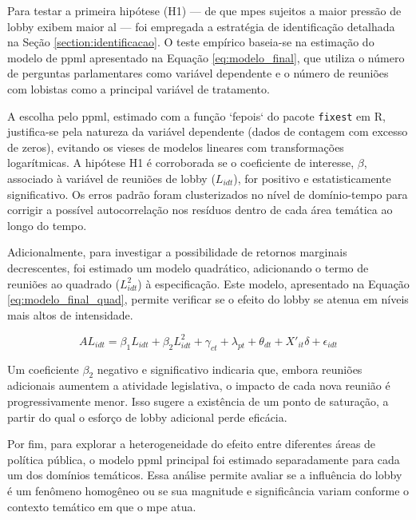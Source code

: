 Para testar a primeira hipótese (H1) — de que \acrshort{mpe}s sujeitos a maior pressão de lobby exibem maior \acrfull{al} — foi empregada a estratégia de identificação detalhada na Seção \ref{section:identificacao}. O teste empírico baseia-se na estimação do modelo de \acrfull{ppml} apresentado na Equação \ref{eq:modelo_final}, que utiliza o número de perguntas parlamentares como variável dependente e o número de reuniões com lobistas como a principal variável de tratamento.

A escolha pelo \acrshort{ppml}, estimado com a função `fepois` do pacote \texttt{fixest} em R, justifica-se pela natureza da variável dependente (dados de contagem com excesso de zeros), evitando os vieses de modelos lineares com transformações logarítmicas. A hipótese H1 é corroborada se o coeficiente de interesse, $\beta$, associado à variável de reuniões de lobby ($L_{idt}$), for positivo e estatisticamente significativo. Os erros padrão foram clusterizados no nível de domínio-tempo para corrigir a possível autocorrelação nos resíduos dentro de cada área temática ao longo do tempo.

Adicionalmente, para investigar a possibilidade de retornos marginais decrescentes, foi estimado um modelo quadrático, adicionando o termo de reuniões ao quadrado ($L_{idt}^2$) à especificação. Este modelo, apresentado na Equação \ref{eq:modelo_final_quad}, permite verificar se o efeito do lobby se atenua em níveis mais altos de intensidade.

\begin{equation}
    \label{eq:modelo_final_quad}
    AL_{idt} = \beta_1 L_{idt} + \beta_2 L_{idt}^2 + \gamma_{ct} + \lambda_{pt} + \theta_{dt} + X'_{it}\delta + \epsilon_{idt}
\end{equation}

Um coeficiente $\beta_2$ negativo e significativo indicaria que, embora reuniões adicionais aumentem a atividade legislativa, o impacto de cada nova reunião é progressivamente menor. Isso sugere a existência de um ponto de saturação, a partir do qual o esforço de lobby adicional perde eficácia.

Por fim, para explorar a heterogeneidade do efeito entre diferentes áreas de política pública, o modelo \acrshort{ppml} principal foi estimado separadamente para cada um dos domínios temáticos. Essa análise permite avaliar se a influência do lobby é um fenômeno homogêneo ou se sua magnitude e significância variam conforme o contexto temático em que o \acrshort{mpe} atua.
